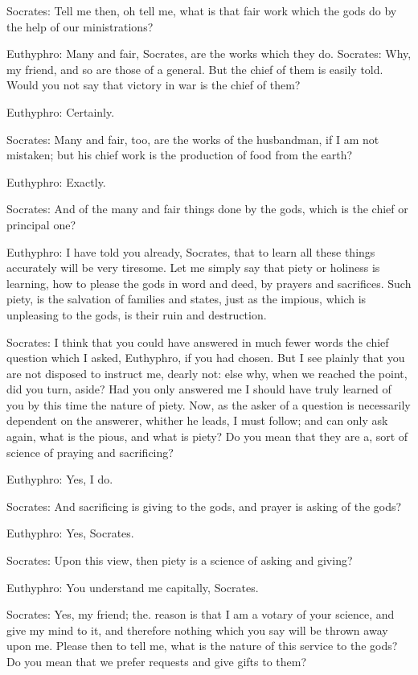 Socrates: Tell me then, oh tell me, what is that fair work which the gods do by the help of our ministrations?

Euthyphro: Many and fair, Socrates, are the works which they do. Socrates: Why, my friend, and so are those of a general. But the chief of them is easily told. Would you not say that victory in war is the chief of them?

Euthyphro: Certainly.

Socrates: Many and fair, too, are the works of the husbandman, if I am not mistaken; but his chief work is the production of food from the earth?

Euthyphro: Exactly.

Socrates: And of the many and fair things done by the gods, which is the chief or principal one?

Euthyphro: I have told you already, Socrates, that to learn all these things accurately will be very tiresome. Let me simply say that piety or holiness is learning, how to please the gods in word and deed, by prayers and sacrifices. Such piety, is the salvation of families and states, just as the impious, which is unpleasing to the gods, is their ruin and destruction.

Socrates: I think that you could have answered in much fewer words the chief question which I asked, Euthyphro, if you had chosen. But I see plainly that you are not disposed to instruct me, dearly not: else why, when we reached the point, did you turn, aside? Had you only answered me I should have truly learned of you by this time the nature of piety. Now, as the asker of a question is necessarily dependent on the answerer, whither he leads, I must follow; and can only ask again, what is the pious, and what is piety? Do you mean that they are a, sort of science of praying and sacrificing?

Euthyphro: Yes, I do.

Socrates: And sacrificing is giving to the gods, and prayer is asking of the gods?

Euthyphro: Yes, Socrates.

Socrates: Upon this view, then piety is a science of asking and giving?

Euthyphro: You understand me capitally, Socrates.

Socrates: Yes, my friend; the. reason is that I am a votary of your science, and give my mind to it, and therefore nothing which you say will be thrown away upon me. Please then to tell me, what is the nature of this service to the gods? Do you mean that we prefer requests and give gifts to them?

